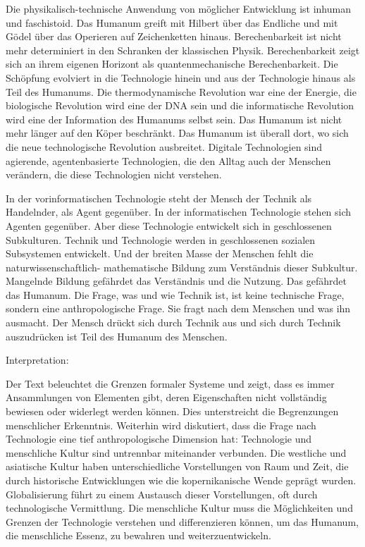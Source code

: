 \documentclass[
]{article}
\begin{document}
Die physikalisch-technische Anwendung von möglicher Entwicklung ist inhuman und faschistoid. Das Humanum greift mit Hilbert über das Endliche und mit Gödel über das Operieren auf Zeichenketten hinaus. Berechenbarkeit ist nicht mehr determiniert in den Schranken der klassischen Physik. Berechenbarkeit zeigt sich an ihrem eigenen Horizont als quantenmechanische Berechenbarkeit. Die Schöpfung evolviert in die Technologie hinein und aus der Technologie hinaus als Teil des Humanums. Die thermodynamische Revolution war eine der Energie, die biologische Revolution wird eine der DNA sein und die informatische Revolution wird eine der Information des Humanums selbst sein. Das Humanum ist nicht mehr länger auf den Köper beschränkt. Das Humanum ist überall dort, wo sich die neue technologische Revolution ausbreitet. Digitale Technologien sind agierende, agentenbasierte Technologien, die den Alltag auch der Menschen verändern, die diese Technologien nicht verstehen.

In der vorinformatischen Technologie steht der Mensch der Technik als Handelnder, als Agent gegenüber. In der informatischen Technologie stehen sich Agenten gegenüber. Aber diese Technologie entwickelt sich in geschlossenen Subkulturen. Technik und Technologie werden in geschlossenen sozialen Subsystemen entwickelt. Und der breiten Masse der Menschen fehlt die naturwissenschaftlich- mathematische Bildung zum Verständnis dieser Subkultur. Mangelnde Bildung gefährdet das Verständnis und die Nutzung. Das gefährdet das Humanum. Die Frage, was und wie Technik ist, ist keine technische Frage, sondern eine anthropologische Frage. Sie fragt nach dem Menschen und was ihn ausmacht. Der Mensch drückt sich durch Technik aus und sich durch Technik auszudrücken ist Teil des Humanum des Menschen.

Interpretation:

Der Text beleuchtet die Grenzen formaler Systeme und zeigt, dass es immer Ansammlungen von Elementen gibt, deren Eigenschaften nicht vollständig bewiesen oder widerlegt werden können. Dies unterstreicht die Begrenzungen menschlicher Erkenntnis. Weiterhin wird diskutiert, dass die Frage nach Technologie eine tief anthropologische Dimension hat: Technologie und menschliche Kultur sind untrennbar miteinander verbunden. Die westliche und asiatische Kultur haben unterschiedliche Vorstellungen von Raum und Zeit, die durch historische Entwicklungen wie die kopernikanische Wende geprägt wurden. Globalisierung führt zu einem Austausch dieser Vorstellungen, oft durch technologische Vermittlung. Die menschliche Kultur muss die Möglichkeiten und Grenzen der Technologie verstehen und differenzieren können, um das Humanum, die menschliche Essenz, zu bewahren und weiterzuentwickeln.
\end{document}
